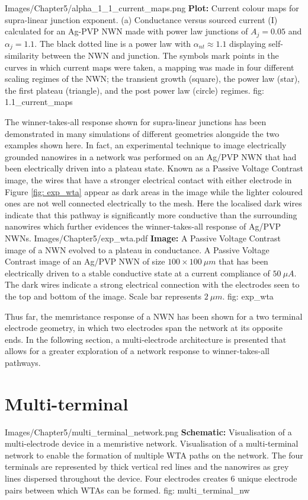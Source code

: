 {Images/Chapter5/alpha_1_1_current_maps.png}
{\textbf{Plot:} Current colour maps for supra-linear junction exponent.}
{(a) Conductance versus sourced current (I) calculated for an Ag-PVP NWN made with power law junctions of $A_j = 0.05$ and $\alpha_j =1.1$. The black dotted line is a power law with $\alpha_{nt} \approx 1.1$ displaying self-similarity between the NWN and junction. The symbols mark points in the curves in which current maps were taken, a mapping was made in four different scaling regimes of the NWN; the transient growth (square), the power law (star), the first plateau (triangle), and the post power law (circle) regimes\cite{scaling2018}.}
{fig: 1.1_current_maps}

The winner-takes-all response shown for supra-linear junctions has been demonstrated in many simulations of different geometries alongside the two examples shown here\cite{scaling2018}. In fact, an experimental technique to image electrically grounded nanowires in a network was performed on an Ag/PVP NWN that had been electrically driven into a plateau state\cite{scaling2018,gemmill2004}. Known as a Passive Voltage Contrast image, the wires that have a stronger electrical contact with either electrode in Figure \ref{fig: exp_wta} appear as dark areas in the image while the lighter coloured ones are not well connected electrically to the mesh\cite{scaling2018}. Here the localised dark wires indicate that this pathway is significantly more conductive than the surrounding nanowires which further evidences the winner-takes-all response of Ag/PVP NWNs.
{Images/Chapter5/exp_wta.pdf}
{\textbf{Image:} A Passive Voltage Contrast image of a NWN evolved to a plateau in conductance.}
{A Passive Voltage Contrast image\cite{gemmill2004} of an Ag/PVP NWN of size $100 \times 100 ~ \mu m$ that has been electrically driven to a stable conductive state at a current compliance of $50 ~ \mu A$. The dark wires indicate a strong electrical connection with the electrodes seen to the top and bottom of the image. Scale bar represents $2 ~ \mu m$\cite{scaling2018}.}
{fig: exp_wta}

Thus far, the memristance response of a NWN has been shown for a two terminal electrode geometry, in which two electrodes span the network at its opposite ends. In the following section, a multi-electrode architecture is presented that allows for a greater exploration of a network response to winner-takes-all pathways.
\section{Multi-terminal}
\label{Sec: multi_terminal}
{Images/Chapter5/multi_terminal_network.png}
{\textbf{Schematic:} Visualisation of a multi-electrode device in a memristive network.}
{Visualisation of a multi-terminal network to enable the formation of multiple WTA paths on the network. The four terminals are represented by thick vertical red lines and the nanowires as grey lines dispersed throughout the device. Four electrodes creates 6 unique electrode pairs between which WTAs can be formed.}
{fig: multi_terminal_nw}

